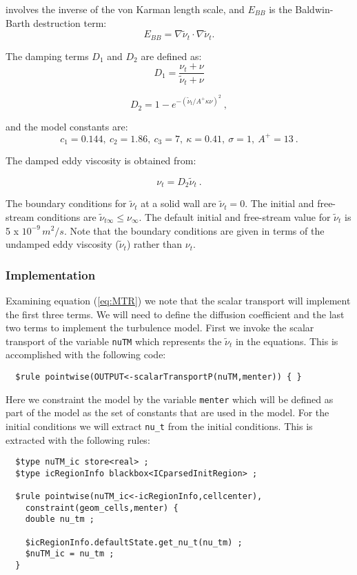 \documentclass[letterpaper,twoside]{article}
\begin{document}
\noindent
involves the inverse of the von Karman length scale, and $E_{BB}$ is
the Baldwin-Barth destruction term:
\begin{equation}
E_{BB} = \nabla \tilde{\nu}_t \cdot \nabla \tilde{\nu}_t .
\end{equation}

The damping terms $D_1$ and $D_2$ are defined as:
\begin{equation}
D_1 = \frac{\nu_t + \nu}{\tilde{\nu}_t + \nu}
\end{equation}

\begin{equation}
D_2 = 1 - e^{-(\tilde{\nu}_t/A^{+} \kappa \nu)^2} \ ,
\end{equation}

\noindent
and the model constants are:
\begin{equation}
c_1 = 0.144, ~c_2 = 1.86, ~c_3 = 7, ~\kappa = 0.41, ~\sigma = 1, ~A^{+} = 13 \ .
\end{equation}

The damped eddy viscosity is obtained from:

\begin{equation}
\nu_t = D_2 \tilde{\nu}_t \ .
\end{equation}

The boundary conditions for $\tilde{\nu}_t$ at a solid wall are
$\tilde{\nu}_t = 0$.  The initial and free-stream conditions are
$\tilde{\nu}_{t \infty} \leq \nu_\infty$.  The default initial and
free-stream value for $\tilde{\nu}_t$ is 5 x $10^{-9} \, m^2/s$.  Note
that the boundary conditions are given in terms of the undamped eddy
viscosity ($\tilde{\nu}_t$) rather than $\nu_t$.

\subsubsection{Implementation}

Examining equation (\ref{eq:MTR}) we note that the scalar transport
will implement the first three terms.  We will need to define the
diffusion coefficient and the last two terms to implement the
turbulence model.  First we invoke the scalar transport of the
variable {\tt nuTM} which represents the $\tilde{\nu}_t$ in the
equations.  This is accomplished with the following code:
\begin{verbatim}
  $rule pointwise(OUTPUT<-scalarTransportP(nuTM,menter)) { }
\end{verbatim}
Here we constraint the model by the variable {\tt menter} which will
be defined as part of the model as the set of constants that are used
in the model.  For the initial conditions we will extract {\tt nu\_t}
from the initial conditions.    This is extracted with the following
rules:
\begin{verbatim}
  $type nuTM_ic store<real> ;
  $type icRegionInfo blackbox<ICparsedInitRegion> ;

  $rule pointwise(nuTM_ic<-icRegionInfo,cellcenter),
    constraint(geom_cells,menter) {
    double nu_tm ;
    
    $icRegionInfo.defaultState.get_nu_t(nu_tm) ;
    $nuTM_ic = nu_tm ;
  }
\end{verbatim}
\end{document}
